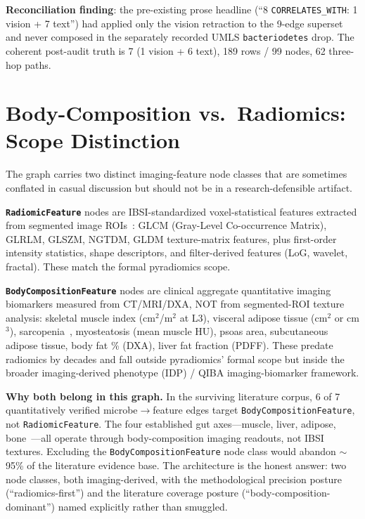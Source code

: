 \documentclass[10pt,twocolumn,letterpaper]{article}
\begin{document}
\textbf{Reconciliation finding}: the pre-existing prose headline (``8
\texttt{CORRELATES\_WITH}: 1 vision + 7 text'') had applied only the
vision retraction to the 9-edge superset and never composed in the
separately recorded UMLS \texttt{bacteriodetes} drop. The coherent
post-audit truth is 7 (1 vision + 6 text), 189 rows / 99 nodes, 62
three-hop paths.

\section{Body-Composition vs.\ Radiomics: Scope Distinction}
\label{app:scope}

The graph carries two distinct imaging-feature node classes that are
sometimes conflated in casual discussion but should not be in a
research-defensible artifact.

\noindent\textbf{\texttt{RadiomicFeature}} nodes are IBSI-standardized
voxel-statistical features extracted from segmented image
ROIs~\cite{lambin2012,aerts2014,zwanenburg2020ibsi,vanGriethuysen2017pyradiomics}:
GLCM (Gray-Level Co-occurrence Matrix), GLRLM, GLSZM, NGTDM, GLDM
texture-matrix features, plus first-order intensity statistics, shape
descriptors, and filter-derived features (LoG, wavelet, fractal). These
match the formal pyradiomics scope.

\noindent\textbf{\texttt{BodyCompositionFeature}} nodes are clinical
aggregate quantitative imaging biomarkers measured from CT/MRI/DXA, NOT
from segmented-ROI texture analysis: skeletal muscle index (cm$^2$/m$^2$
at L3), visceral adipose tissue (cm$^2$ or cm$^3$),
sarcopenia~\cite{cruzjentoft2019ewgsop2}, myosteatosis (mean muscle HU),
psoas area, subcutaneous adipose tissue, body fat \% (DXA), liver fat
fraction (PDFF). These predate radiomics by decades and fall outside
pyradiomics' formal scope but inside the broader imaging-derived
phenotype (IDP) / QIBA imaging-biomarker framework.

\noindent\textbf{Why both belong in this graph.} In the surviving
literature corpus, 6 of 7 quantitatively verified microbe$\rightarrow$feature
edges target \texttt{BodyCompositionFeature}, not \texttt{RadiomicFeature}.
The four established gut axes---muscle, liver, adipose,
bone~\cite{ticinesi2019gutmuscle,tilg2022gutliver,cani2008endotoxemia,sokol2008faecalibacterium}---all
operate through body-composition imaging readouts, not IBSI textures.
Excluding the \texttt{BodyCompositionFeature} node class would abandon
$\sim$95\% of the literature evidence base. The architecture is the
honest answer: two node classes, both imaging-derived, with the
methodological precision posture (``radiomics-first'') and the literature
coverage posture (``body-composition-dominant'') named explicitly rather
than smuggled.
\end{document}
